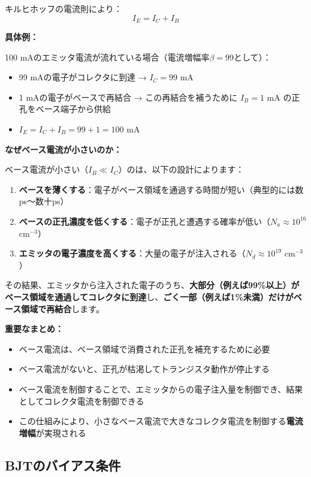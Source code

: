 キルヒホッフの電流則により：
\begin{equation}
I_E = I_C + I_B
\end{equation}

\textbf{具体例：}

100 mAのエミッタ電流が流れている場合（電流増幅率$\beta = 99$として）：

\begin{itemize}
\item 99 mAの電子がコレクタに到達 → $I_C = 99$ mA
\item 1 mAの電子がベースで再結合 → この再結合を補うために $I_B = 1$ mA の正孔をベース端子から供給
\item $I_E = I_C + I_B = 99 + 1 = 100$ mA
\end{itemize}

\textbf{なぜベース電流が小さいのか：}

ベース電流が小さい（$I_B \ll I_C$）のは、以下の設計によります：

\begin{enumerate}
\item \textbf{ベースを薄くする}：電子がベース領域を通過する時間が短い（典型的には数ps〜数十ps）
\item \textbf{ベースの正孔濃度を低くする}：電子が正孔と遭遇する確率が低い（$N_a \approx 10^{16}$ cm$^{-3}$）
\item \textbf{エミッタの電子濃度を高くする}：大量の電子が注入される（$N_d \approx 10^{19}$ cm$^{-3}$）
\end{enumerate}

その結果、エミッタから注入された電子のうち、\textbf{大部分（例えば99\%以上）がベース領域を通過してコレクタに到達}し、\textbf{ごく一部（例えば1\%未満）だけがベース領域で再結合}します。

\textbf{重要なまとめ：}

\begin{itemize}
\item ベース電流は、ベース領域で消費された正孔を補充するために必要
\item ベース電流がないと、正孔が枯渇してトランジスタ動作が停止する
\item ベース電流を制御することで、エミッタからの電子注入量を制御でき、結果としてコレクタ電流を制御できる
\item この仕組みにより、小さなベース電流で大きなコレクタ電流を制御する\textbf{電流増幅}が実現される
\end{itemize}

\subsection{BJTのバイアス条件}

